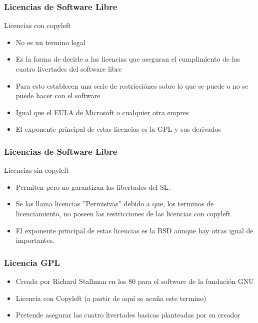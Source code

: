 \documentclass[11pt]{beamer}
\begin{document}
\begin{frame}
\frametitle{Licencias de Software Libre}
\begin{center}
\begin{Large}
Licencias con copyleft {\Huge \textcopyleft}
\end{Large}
\end{center}

\begin{itemize}[<+-| alert@+>]
\item No es un termino legal
\item Es la forma de decirle a las licencias que \alert{aseguran} el cumplimiento de las cuatro livertades del software libre
\item Para esto establecen una serie de restricci\'ones sobre lo que se puede o no se puede hacer con el software
\item Igual que el EULA de Microsoft o cualquier otra empres
\item El exponente principal de estas licencias es la GPL y sus derivados
\end{itemize}
\end{frame}


\begin{frame}
\frametitle{Licencias de Software Libre}
\begin{center}
\begin{Large}
Licencias \alert{sin} copyleft {\Huge \textcopyleft}
\end{Large}
\end{center}

\begin{itemize}[<+-| alert@+>]
\item Permiten pero no garantizan las libertades del SL.
\item Se las llama licencias ''Permisivas'' debido a que, los terminos de licenciamiento, no poseen las restricciones de las licencias con copyleft
\item El exponente principal de estas licencias es la BSD aunque hay otras igual de importantes.
\end{itemize}
\end{frame}

\begin{frame}
\frametitle{Licencia GPL}
\begin{itemize}[<+-| alert@+>]
\item Creada por Richard Stallman en los 80 para el software de la fundaci\'on GNU
\item Licencia con Copyleft (a partir de aqu\'i se acu\~na este termino)
\item Pretende asegurar las cuatro livertades basicas planteadas por su creador
\end{itemize}
\end{frame}
\end{document}

